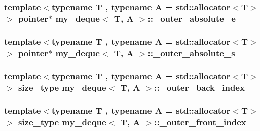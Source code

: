 \hypertarget{classmy__deque_acb50b7ef1b7fd94ef73c1f39c8296f80}{
\subsubsection[{\-\_\-outer\-\_\-absolute\-\_\-e}]{\setlength{\rightskip}{0pt plus 5cm}template$<$typename T , typename A  = std\-::allocator$<$\-T$>$$>$ {\bf pointer}$\ast$ {\bf my\-\_\-deque}$<$ T, A $>$\-::\-\_\-outer\-\_\-absolute\-\_\-e\hspace{0.3cm}{\ttfamily [private]}}}\label{classmy__deque_acb50b7ef1b7fd94ef73c1f39c8296f80}
\hypertarget{classmy__deque_aa43696c4810d7eef04cc64879114051b}{
\subsubsection[{\-\_\-outer\-\_\-absolute\-\_\-s}]{\setlength{\rightskip}{0pt plus 5cm}template$<$typename T , typename A  = std\-::allocator$<$\-T$>$$>$ {\bf pointer}$\ast$ {\bf my\-\_\-deque}$<$ T, A $>$\-::\-\_\-outer\-\_\-absolute\-\_\-s\hspace{0.3cm}{\ttfamily [private]}}}\label{classmy__deque_aa43696c4810d7eef04cc64879114051b}
\hypertarget{classmy__deque_aba30f2f28f6fd86adcc05e61e807c960}{
\subsubsection[{\-\_\-outer\-\_\-back\-\_\-index}]{\setlength{\rightskip}{0pt plus 5cm}template$<$typename T , typename A  = std\-::allocator$<$\-T$>$$>$ {\bf size\-\_\-type} {\bf my\-\_\-deque}$<$ T, A $>$\-::\-\_\-outer\-\_\-back\-\_\-index\hspace{0.3cm}{\ttfamily [private]}}}\label{classmy__deque_aba30f2f28f6fd86adcc05e61e807c960}
\hypertarget{classmy__deque_a11907ad88429929495516989be2afd75}{
\subsubsection[{\-\_\-outer\-\_\-front\-\_\-index}]{\setlength{\rightskip}{0pt plus 5cm}template$<$typename T , typename A  = std\-::allocator$<$\-T$>$$>$ {\bf size\-\_\-type} {\bf my\-\_\-deque}$<$ T, A $>$\-::\-\_\-outer\-\_\-front\-\_\-index\hspace{0.3cm}{\ttfamily [private]}}}\label{classmy__deque_a11907ad88429929495516989be2afd75}
